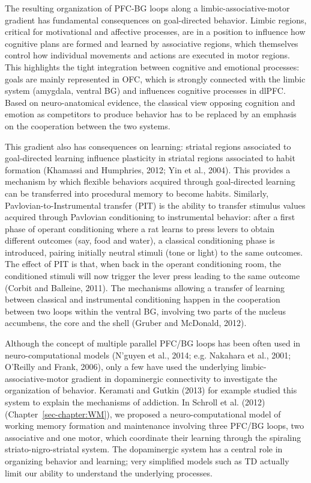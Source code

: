 \documentclass[
  11pt,
  a4paper,
]{scrbook}
\begin{document}
The resulting organization of PFC-BG loops along a
limbic-associative-motor gradient has fundamental consequences on
goal-directed behavior. Limbic regions, critical for motivational and
affective processes, are in a position to influence how cognitive plans
are formed and learned by associative regions, which themselves control
how individual movements and actions are executed in motor regions. This
highlights the tight integration between cognitive and emotional
processes: goals are mainly represented in OFC, which is strongly
connected with the limbic system (amygdala, ventral BG) and influences
cognitive processes in dlPFC. Based on neuro-anatomical evidence, the
classical view opposing cognition and emotion as competitors to produce
behavior has to be replaced by an emphasis on the cooperation between
the two systems.

This gradient also has consequences on learning: striatal regions
associated to goal-directed learning influence plasticity in striatal
regions associated to habit formation (Khamassi and Humphries, 2012; Yin
et al., 2004). This provides a mechanism by which flexible behaviors
acquired through goal-directed learning can be transferred into
procedural memory to become habits. Similarly, Pavlovian-to-Instrumental
transfer (PIT) is the ability to transfer stimulus values acquired
through Pavlovian conditioning to instrumental behavior: after a first
phase of operant conditioning where a rat learns to press levers to
obtain different outcomes (say, food and water), a classical
conditioning phase is introduced, pairing initially neutral stimuli
(tone or light) to the same outcomes. The effect of PIT is that, when
back in the operant conditioning room, the conditioned stimuli will now
trigger the lever press leading to the same outcome (Corbit and
Balleine, 2011). The mechanisms allowing a transfer of learning between
classical and instrumental conditioning happen in the cooperation
between two loops within the ventral BG, involving two parts of the
nucleus accumbens, the core and the shell (Gruber and McDonald, 2012).

Although the concept of multiple parallel PFC/BG loops has been often
used in neuro-computational models (N'guyen et al., 2014; e.g. Nakahara
et al., 2001; O'Reilly and Frank, 2006), only a few have used the
underlying limbic-associative-motor gradient in dopaminergic
connectivity to investigate the organization of behavior. Keramati and
Gutkin (2013) for example studied this system to explain the mechanisms
of addiction. In Schroll et al. (2012) (Chapter~\ref{sec-chapter:WM}),
we proposed a neuro-computational model of working memory formation and
maintenance involving three PFC/BG loops, two associative and one motor,
which coordinate their learning through the spiraling
striato-nigro-striatal system. The dopaminergic system has a central
role in organizing behavior and learning; very simplified models such as
TD actually limit our ability to understand the underlying processes.
\end{document}

